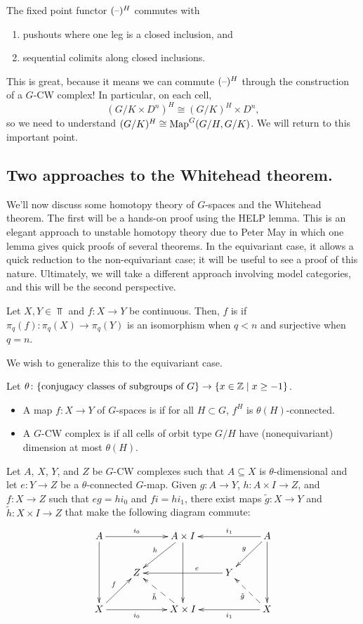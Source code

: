 \begin{prop}
The fixed point functor $(\text{--})^H$ commutes with
\begin{enumerate}
	\item pushouts where one leg is a closed inclusion, and
	\item sequential colimits along closed inclusions.
\end{enumerate}
\end{prop}
This is great, because it means we can commute $(\text{--})^H$ through the construction of a $G$-CW complex! In
particular, on each cell,
\[(G/K\times D^n)^H\cong (G/K)^H\times D^n,\]
so we need to understand $(G/K)^H\cong\operatorname{Map}^G(G/H,G/K)$. We will return to this important point.
\subsection*{Two approaches to the Whitehead theorem.}
We'll now discuss some homotopy theory of $G$-spaces and the Whitehead theorem. The first will be a hands-on proof
using the HELP lemma. This is an elegant approach to unstable homotopy theory due to Peter May in which one lemma
gives quick proofs of several theorems. In the equivariant case, it allows a quick reduction to the non-equivariant
case; it will be useful to see a proof of this nature. Ultimately, we will take a different approach involving
model categories, and this will be the second perspective.
\begin{defn}
Let $X,Y\in\Top$ and $f:X\to Y$ be continuous. Then, $f$ is  if $\pi_q(f):\pi_q(X)\to\pi_q(Y)$
is an isomorphism when $q < n$ and surjective when $q = n$.
\end{defn}
We wish to generalize this to the equivariant case.
\begin{defn}
Let $\theta\colon\{\text{conjugacy classes of subgroups of $G$}\}\to\{x\in\mathbb Z\mid x\ge -1\}$.
\begin{itemize}
	\item A map $f:X\to Y$ of $G$-spaces is  if for all $H\subset G$, $f^H$ is
	$\theta(H)$-connected.
	\item A $G$-CW complex is  if all cells of orbit type $G/H$ have (nonequivariant)
	dimension at most $\theta(H)$.
\end{itemize}
\end{defn}
\begin{thm}
\label{HELP}
Let $A$, $X$, $Y$, and $Z$ be $G$-CW complexes such that $A\subseteq X$ is $\theta$-dimensional and let $e:Y\to Z$
be a $\theta$-connected $G$-map. Given $g\colon A\to Y$, $h\colon A\times I\to Z$, and $f\colon X\to Z$ such that $eg = hi_0$ and
$fi = hi_1$, there exist maps $\tilde g\colon X\to Y$ and $\tilde h\colon X\times I\to Z$ that make the following diagram commute:
\[\xymatrix{
	A \ar[dd] \ar[rr]^-{i_0} && A\times I \ar[dd] \ar[dl]_-h && \ar[ll]_-{i_1} \ar[dl]_-g A \ar[dd]\\
	& Z && \ar[ll]_(0.35)e Y\\
	X \ar[ur]^-f \ar[rr]_-{i_0} && \ar@{-->}[ul]^-{\tilde h} X\times I && \ar[ll]^-{i_1} \ar@{-->}[ul]^-{\tilde g} X
}\]
\end{thm}
